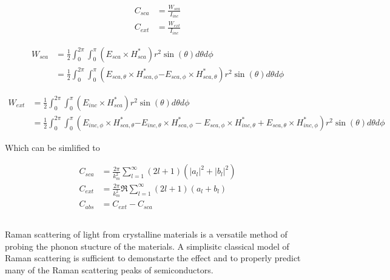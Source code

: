             \begin{align}
                C_{sca} &= \frac{W_{sca}}{I_{inc}} \\
                C_{ext} &= \frac{W_{ext}}{I_{inc}}
            \end{align}

            \begin{align}
                W_{sca} &= \frac{1}{2}\int_0^{2\pi}\int_0^\pi \left(E_{sca} \times H^*_{sca}\right)r^2\sin(\theta)d\theta d\phi \\
                 &= \frac{1}{2}\int_0^{2\pi}\int_0^\pi \left(E_{sca,\theta} \times H^*_{sca,\phi}\right.
                                \left.- E_{sca,\phi} \times H^*_{sca,\theta}\right)r^2\sin(\theta)d\theta d\phi
            \end{align}

            \begin{align}
                W_{ext} &= \frac{1}{2}\int_0^{2\pi}\int_0^\pi \left(E_{inc} \times H^*_{sca}\right)r^2\sin(\theta)d\theta d\phi \\
                 &= \frac{1}{2}\int_0^{2\pi}\int_0^\pi \left(E_{inc,\phi} \times H^*_{sca,\theta}\right.
                                \left.- E_{inc,\theta} \times H^*_{sca,\phi} - E_{sca,\phi} \times H^*_{inc,\theta}
                                               + E_{sca,\theta} \times H^*_{inc,\phi}\right)r^2\sin(\theta)d\theta d\phi
            \end{align}

            Which can be simlified to

            \begin{align}
                C_{sca} &= \frac{2\pi}{k^2_m}\sum_{l=1}^\infty (2l +1)(|a_l|^2 + |b_l|^2)\\
                C_{ext} &= \frac{2\pi}{k^2_m}\Re\sum_{l=1}^\infty (2l +1)(a_l + b_l)\\
                C_{abs} &= C_{ext} - C_{sca}
            \end{align}

    \subsection{}
            Raman scattering of light from crystalline materials is a versatile method of probing the phonon stucture of the materials.
        A simplisitc classical model of Raman scattering is sufficient to demonstarte the effect and to properly predict many of the
        Raman scattering peaks of semiconductors\cite{peter2010fundamentals}.

